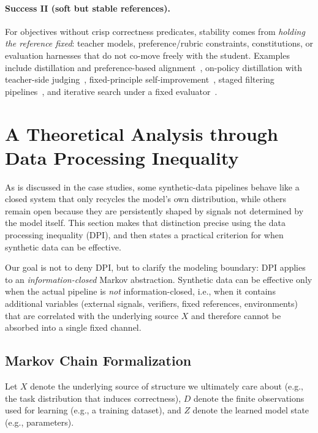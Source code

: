 \documentclass{article}
\theoremstyle{plain}
\theoremstyle{definition}
\theoremstyle{remark}
\begin{document}
\paragraph{Success II (soft but stable references).}
For objectives without crisp correctness predicates, stability comes from \textit{holding the reference fixed}: teacher models, preference/rubric constraints, constitutions, or evaluation harnesses that do not co-move freely with the student. Examples include distillation and preference-based alignment~\cite{hintonDistillingKnowledgeNeural2015,gudibandeFalsePromiseImitating2024,tunstallZephyrDirectDistillation2024}, on-policy distillation with teacher-side judging~\cite{xiaomillm-coreteamMiMoV2FlashTechnicalReport2026,agarwalOnPolicyDistillationLanguage2024,luOnPolicyDistillation2025}, fixed-principle self-improvement~\cite{baiConstitutionalAIHarmlessness2022}, staged filtering pipelines~\cite{gudibandeFalsePromiseImitating2024}, and iterative search under a fixed evaluator~\cite{yuanSelfRewardingLanguageModels2024}.

\section{A Theoretical Analysis through Data Processing Inequality}
\label{sec:theory}

As is discussed in the case studies, some synthetic-data pipelines behave like a closed system that only recycles the model's own distribution, while others remain open because they are persistently shaped by signals not determined by the model itself. This section makes that distinction precise using the data processing inequality (DPI), and then states a practical criterion for when synthetic data can be effective.

Our goal is not to deny DPI, but to clarify the modeling boundary: DPI applies to an \textit{information-closed} Markov abstraction. Synthetic data can be effective only when the actual pipeline is \textit{not} information-closed, i.e., when it contains additional variables (external signals, verifiers, fixed references, environments) that are correlated with the underlying source $X$ and therefore cannot be absorbed into a single fixed channel.

\subsection{Markov Chain Formalization}

Let $X$ denote the underlying source of structure we ultimately care about (e.g., the task distribution that induces correctness), $D$ denote the finite observations used for learning (e.g., a training dataset), and $Z$ denote the learned model state (e.g., parameters).
\end{document}
